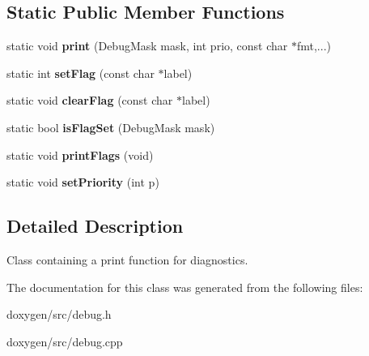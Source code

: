 \subsection*{Static Public Member Functions}
\begin{DoxyCompactItemize}
\item 
\mbox{\label{class_debug_a5d86ffebf96f9f75b6c957db5f831da3}} 
static void {\bfseries print} (Debug\+Mask mask, int prio, const char $\ast$fmt,...)
\item 
\mbox{\label{class_debug_a24711079b52ca1e61539e7caa4ca61d8}} 
static int {\bfseries set\+Flag} (const char $\ast$label)
\item 
\mbox{\label{class_debug_a1e78a9cfc37f50990e7701d56f7bf207}} 
static void {\bfseries clear\+Flag} (const char $\ast$label)
\item 
\mbox{\label{class_debug_a92b0668ebfb43903d82ad112bf6c84e1}} 
static bool {\bfseries is\+Flag\+Set} (Debug\+Mask mask)
\item 
\mbox{\label{class_debug_a9a7dd2cc5af4551bf2d34ce8ba5a78b7}} 
static void {\bfseries print\+Flags} (void)
\item 
\mbox{\label{class_debug_a666b610770dd7b7c0a87f2415aefe7d9}} 
static void {\bfseries set\+Priority} (int p)
\end{DoxyCompactItemize}


\subsection{Detailed Description}
Class containing a print function for diagnostics. 

The documentation for this class was generated from the following files\+:\begin{DoxyCompactItemize}
\item 
doxygen/src/debug.\+h\item 
doxygen/src/debug.\+cpp\end{DoxyCompactItemize}
